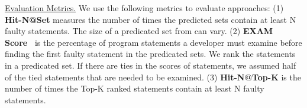 \underline{Evaluation Metrics.}  
We use the following metrics to evaluate approaches: 
(1) {\bf Hit-N@Set} measures the number of times the predicted sets contain at least N faulty statements. %
The size of a predicated set from {\tool} can vary. %
(2) {\bf EXAM Score~\cite{wong2008crosstab}} is the percentage of program statements a developer must examine before finding the first faulty statement in the predicated sets. We rank the statements in a predicated set. If there are ties in the scores of statements, we assumed half of the tied statements that are needed to be examined. 
(3) {\bf Hit-N@Top-K} is the number of times the Top-K ranked statements contain at least N faulty statements. %




